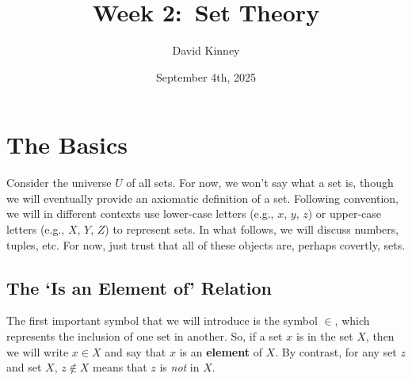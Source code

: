 \documentclass[11pt]{article}
\title{Week 2:\ Set Theory}
\author{David Kinney}
\date{September 4th, 2025}
\theoremstyle{definition}
\theoremstyle{remark}
\begin{document}
\maketitle

\section{The Basics}
Consider the universe $U$ of all sets. For now, we won't say what a set is, though we will eventually provide an axiomatic definition of a set. Following convention, we will in different contexts use lower-case letters (e.g., $x$, $y$, $z$) or upper-case letters (e.g., $X$, $Y$, $Z$) to represent sets. In what follows, we will discuss numbers, tuples, etc. For now, just trust that all of these objects are, perhaps covertly, sets.

\subsection{The `Is an Element of' Relation}
The first important symbol that we will introduce is the symbol $\in$, which represents the inclusion of one set in another. So, if a set $x$ is in the set $X$, then we will write $x\in X$ and say that $x$ is an \textbf{element} of $X$. By contrast, for any set $z$ and set $X$, $z\not\in X$ means that $z$ is \textit{not} in $X$.
\end{document}
